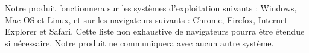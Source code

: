 Notre produit fonctionnera sur les systèmes d'exploitation suivants : Windows, Mac OS et Linux, et sur les navigateurs suivants : Chrome, Firefox, Internet Explorer et Safari. Cette liste non exhaustive de navigateurs pourra être étendue si nécessaire.  Notre produit ne communiquera avec aucun autre système.

